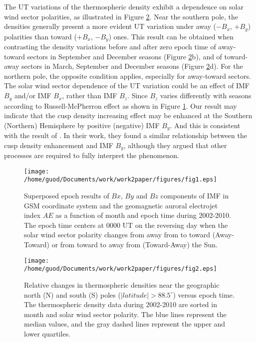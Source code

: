 \documentclass[draft, grl]{/home/guod/Documents/template/agu_template/AGUTeX}
\begin{document}
\begin{article}
    The UT variations of the thermospheric density exhibit a dependence on solar wind sector polarities, 
    as illustrated in Figure \ref{figure2}. 
    Near the southern pole, the densities generally present a more evident UT variation under 
    away ($-B_x$, $+B_y$) polarities than toward ($+B_x$, $-B_y$) ones.
    This result can be obtained when contrasting the density variations before and after zero
    epoch time of away-toward sectors in September and December seasons (Figure \ref{figure2}b), 
    and of toward-away sectors in March, September and December seasons (Figure \ref{figure2}d).
    For the northern pole, the opposite condition applies, especially for away-toward sectors.
    The solar wind sector dependence of the UT variation could be an effect of IMF $B_y$ and/or 
    IMF $B_x$, rather than IMF $B_z$. 
    Since $B_z$ varies differently with seasons according to Russell-McPherron effect as shown 
    in Figure \ref{figure1}.
    Our result may indicate that the cusp density increasing effect may be enhanced at the Southern
    (Northern) Hemisphere by positive (negative) IMF $B_y$.
    And this is consistent with the result of \citet{Yamazaki2015a}. 
    In their work, they found a similar relationship between the cusp density enhancement 
    and IMF $B_y$, although they argued that other processes are required to fully interpret 
    the phenomenon.

    


\end{article}
\begin{figure}
    \centering
    \noindent\texttt{[image: /home/guod/Documents/work/work2paper/figures/fig1.eps]}
    \caption{Superposed epoch results of $Bx$, $By$ and $Bz$ components of IMF in GSM coordinate system and the
    geomagnetic auroral electrojet index $AE$ as a function of month and epoch time during 2002-2010. The epoch 
    time centers at 0000 UT on the reversing day when the solar wind sector polarity changes from away from to 
    toward (Away-Toward) or from toward to away from (Toward-Away) the Sun. }
    \label{figure1}
\end{figure}
\begin{figure}
    \centering
    \noindent\texttt{[image: /home/guod/Documents/work/work2paper/figures/fig2.eps]}
    \caption{Relative changes in thermospheric densities near the geographic north (N) and south (S) poles 
    ($\left|latitude\right| > 88.5^\circ$) versus epoch time. The thermospheric density data during 2002-2010 
    are sorted in month and solar wind sector polarity. The blue lines represent the median values, and the 
    gray dashed lines represent the upper and lower quartiles.}
    \label{figure2}
\end{figure}
\end{document}

